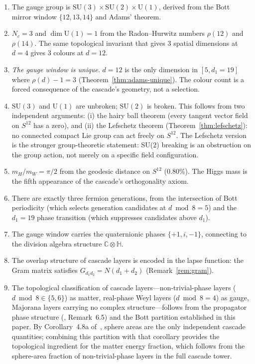 \documentclass[12pt,a4paper]{article}
\begin{document}
\begin{enumerate}
\item The gauge group is $\mathrm{SU}(3)\times\mathrm{SU}(2)\times\mathrm{U}(1)$, derived
from the Bott mirror window $\{12,13,14\}$ and Adams' theorem.

\item $N_c=3$ and $\dim\mathrm{U}(1)=1$ from the Radon--Hurwitz numbers $\rho(12)$ and
$\rho(14)$. The same topological invariant that gives 3 spatial dimensions at $d=4$ gives
3 colours at $d=12$.

\item \emph{The gauge window is unique.} $d=12$ is the only dimension in $[5,d_1=19]$ where
$\rho(d)-1=3$ (Theorem~\ref{thm:adams-unique}). The colour count is a forced consequence
of the cascade's geometry, not a selection.

\item $\mathrm{SU}(3)$ and $\mathrm{U}(1)$ are unbroken; $\mathrm{SU}(2)$ is broken.
This follows from two independent arguments: (i) the hairy ball theorem (every tangent
vector field on $S^{12}$ has a zero), and (ii) the Lefschetz theorem
(Theorem~\ref{thm:lefschetz}): no connected compact Lie group can act freely on $S^{12}$.
The Lefschetz version is the stronger group-theoretic statement: SU(2) breaking is an
obstruction on the group action, not merely on a specific field configuration.

\item $m_H/m_W=\pi/2$ from the geodesic distance on $S^{12}$ (0.80\%). The Higgs mass is
the fifth appearance of the cascade's orthogonality axiom.

\item There are exactly three fermion generations, from the intersection of Bott periodicity
(which selects generation candidates at $d\bmod 8=5$) and the $d_1=19$ phase transition
(which suppresses candidates above $d_1$).

\item The gauge window carries the quaternionic phases $\{+1,i,-1\}$, connecting to the
division algebra structure $\mathbb{C}\otimes\mathbb{H}$.

\item The overlap structure of cascade layers is encoded in the lapse function: the Gram
matrix satisfies $G_{d_1 d_2}=N(d_1+d_2)$ (Remark~\ref{rem:gram}).

\item The topological classification of cascade layers---non-trivial-phase layers
($d\bmod 8\in\{5,6\}$) as matter, real-phase Weyl layers ($d\bmod 8=4$) as gauge,
Majorana layers carrying no complex structure---follows from the propagator phase
structure (\cite{paperII}, Remark~6.5) and the Bott partition established in this paper.
By Corollary~4.8a of~\cite{paperI}, sphere areas are the only independent cascade
quantities; combining this partition with that corollary provides the topological ingredient
for the matter energy fraction, which follows from the sphere-area fraction of
non-trivial-phase layers in the full cascade tower.
\end{enumerate}
\end{document}
